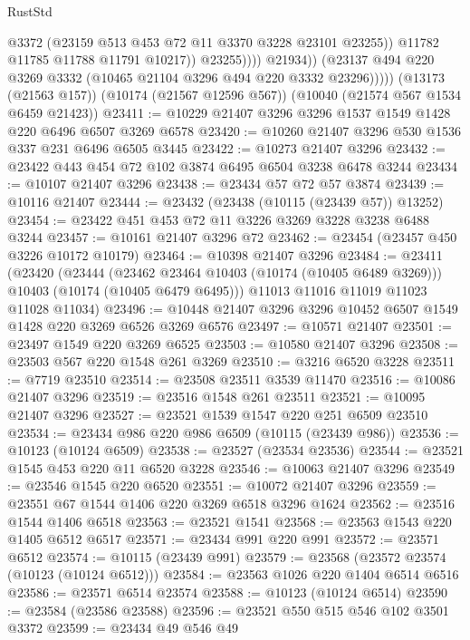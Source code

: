 \begin{lexlean}{RustStd}
\begin{coremodule}
                            @3372
                            (@23159 @513 @453 @72 @11 @3370 @3228 @23101 @23255))
                          @11782
                          @11785
                          @11788
                          @11791
                          @10217))
                      @23255))))
              @21934))
          (@23137 @494 @220 @3269 @3332 (@10465 @21104 @3296 @494 @220 @3332 @23296)))))
    (@13173 (@21563 @157))
    (@10174 (@21567 @12596 @567))
    (@10040 (@21574 @567 @1534 @6459 @21423))
@23411 := @10229 @21407 @3296 @3296 @1537 @1549 @1428 @220 @6496 @6507 @3269 @6578
@23420 := @10260 @21407 @3296 @530 @1536 @337 @231 @6496 @6505 @3445
@23422 := @10273 @21407 @3296
@23432 := @23422 @443 @454 @72 @102 @3874 @6495 @6504 @3238 @6478 @3244
@23434 := @10107 @21407 @3296
@23438 := @23434 @57 @72 @57 @3874
@23439 := @10116 @21407
@23444 := @23432 (@23438 (@10115 (@23439 @57)) @13252)
@23454 := @23422 @451 @453 @72 @11 @3226 @3269 @3228 @3238 @6488 @3244
@23457 := @10161 @21407 @3296 @72
@23462 := @23454 (@23457 @450 @3226 @10172 @10179)
@23464 := @10398 @21407 @3296
@23484 := @23411
    (@23420
      (@23444
        (@23462 @23464 @10403 (@10174 (@10405 @6489 @3269)))
        @10403
        (@10174 (@10405 @6479 @6495)))
      @11013
      @11016
      @11019
      @11023
      @11028
      @11034)
@23496 := @10448 @21407 @3296 @3296 @10452 @6507 @1549 @1428 @220 @3269 @6526 @3269 @6576
@23497 := @10571 @21407
@23501 := @23497 @1549 @220 @3269 @6525
@23503 := @10580 @21407 @3296
@23508 := @23503 @567 @220 @1548 @261 @3269
@23510 := @3216 @6520 @3228
@23511 := @7719 @23510
@23514 := @23508 @23511 @3539 @11470
@23516 := @10086 @21407 @3296
@23519 := @23516 @1548 @261 @23511
@23521 := @10095 @21407 @3296
@23527 := @23521 @1539 @1547 @220 @251 @6509 @23510
@23534 := @23434 @986 @220 @986 @6509 (@10115 (@23439 @986))
@23536 := @10123 (@10124 @6509)
@23538 := @23527 (@23534 @23536)
@23544 := @23521 @1545 @453 @220 @11 @6520 @3228
@23546 := @10063 @21407 @3296
@23549 := @23546 @1545 @220 @6520
@23551 := @10072 @21407 @3296
@23559 := @23551 @67 @1544 @1406 @220 @3269 @6518 @3296 @1624
@23562 := @23516 @1544 @1406 @6518
@23563 := @23521 @1541
@23568 := @23563 @1543 @220 @1405 @6512 @6517
@23571 := @23434 @991 @220 @991
@23572 := @23571 @6512
@23574 := @10115 (@23439 @991)
@23579 := @23568 (@23572 @23574 (@10123 (@10124 @6512)))
@23584 := @23563 @1026 @220 @1404 @6514 @6516
@23586 := @23571 @6514 @23574
@23588 := @10123 (@10124 @6514)
@23590 := @23584 (@23586 @23588)
@23596 := @23521 @550 @515 @546 @102 @3501 @3372
@23599 := @23434 @49 @546 @49

\end{coremodule}
\end{lexlean}
